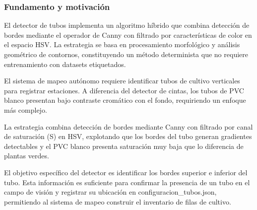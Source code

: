 \subsubsection{Fundamento y motivación}

El detector de tubos implementa un algoritmo híbrido que combina detección de bordes mediante el operador de Canny con filtrado por características de color en el espacio HSV. La estrategia se basa en procesamiento morfológico y análisis geométrico de contornos, constituyendo un método determinista que no requiere entrenamiento con datasets etiquetados.

El sistema de mapeo autónomo requiere identificar tubos de cultivo verticales para registrar estaciones. A diferencia del detector de cintas, los tubos de PVC blanco presentan bajo contraste cromático con el fondo, requiriendo un enfoque más complejo.

La estrategia combina detección de bordes mediante Canny con filtrado por canal de saturación (S) en HSV, explotando que los bordes del tubo generan gradientes detectables y el PVC blanco presenta saturación muy baja que lo diferencia de plantas verdes.

El objetivo específico del detector es identificar los bordes superior e inferior del tubo. Esta información es suficiente para confirmar la presencia de un tubo en el campo de visión y registrar su ubicación en configuracion\_tubos.json, permitiendo al sistema de mapeo construir el inventario de filas de cultivo.